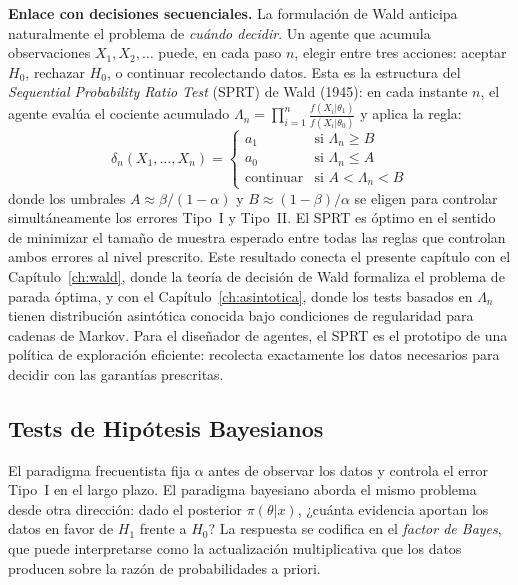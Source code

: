 \textbf{Enlace con decisiones secuenciales.} La formulación de Wald anticipa
naturalmente el problema de \emph{cuándo decidir}. Un agente que acumula
observaciones $X_1, X_2, \ldots$ puede, en cada paso $n$, elegir entre tres
acciones: aceptar $H_0$, rechazar $H_0$, o continuar recolectando datos.
Esta es la estructura del \emph{Sequential Probability Ratio Test} (SPRT) de
Wald (1945): en cada instante $n$, el agente evalúa el cociente acumulado
$\Lambda_n = \prod_{i=1}^n \frac{f(X_i|\theta_1)}{f(X_i|\theta_0)}$ y aplica
la regla:
\[
	\delta_n(X_1,\ldots,X_n) = \begin{cases}
		a_1       & \text{si } \Lambda_n \geq B \\
		a_0       & \text{si } \Lambda_n \leq A \\
		\text{continuar} & \text{si } A < \Lambda_n < B
	\end{cases}
\]
donde los umbrales $A \approx \beta/(1-\alpha)$ y $B \approx (1-\beta)/\alpha$
se eligen para controlar simultáneamente los errores Tipo~I y Tipo~II. El SPRT
es óptimo en el sentido de minimizar el tamaño de muestra esperado entre todas
las reglas que controlan ambos errores al nivel prescrito. Este resultado
conecta el presente capítulo con el Capítulo~\ref{ch:wald}, donde la teoría
de decisión de Wald formaliza el problema de parada óptima, y con el
Capítulo~\ref{ch:asintotica}, donde los tests basados en $\Lambda_n$
tienen distribución asintótica conocida bajo condiciones de regularidad para
cadenas de Markov. Para el diseñador de agentes, el SPRT es el prototipo
de una política de exploración eficiente: recolecta exactamente los datos
necesarios para decidir con las garantías prescritas.

\subsection{Tests de Hipótesis Bayesianos}
\label{sec:ch4-bayes}

El paradigma frecuentista fija $\alpha$ antes de observar los datos y controla
el error Tipo~I en el largo plazo. El paradigma bayesiano aborda el mismo problema
desde otra dirección: dado el posterior $\pi(\theta|x)$, ¿cuánta evidencia aportan
los datos en favor de $H_1$ frente a $H_0$? La respuesta se codifica en el
\emph{factor de Bayes}, que puede interpretarse como la actualización multiplicativa
que los datos producen sobre la razón de probabilidades a priori.

